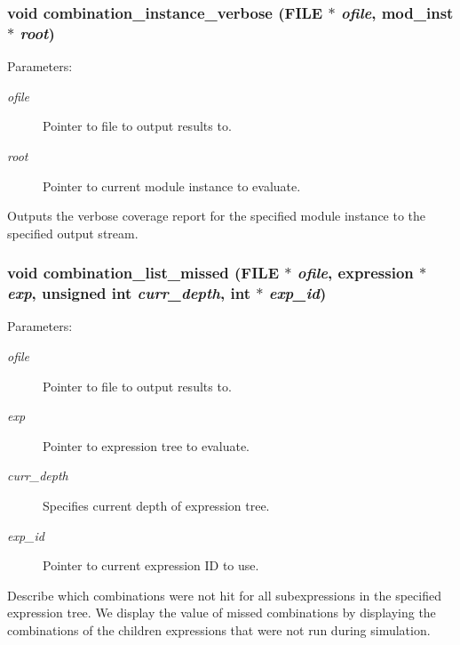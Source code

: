 \subsubsection{\setlength{\rightskip}{0pt plus 5cm}void combination\_\-instance\_\-verbose (FILE $\ast$ {\em ofile}, {\bf mod\_\-inst} $\ast$ {\em root})}\label{comb_8c_a18}


\begin{Desc}
\item[Parameters:]
\begin{description}
\item[{\em ofile}]Pointer to file to output results to. \item[{\em root}]Pointer to current module instance to evaluate.\end{description}
\end{Desc}
Outputs the verbose coverage report for the specified module instance to the specified output stream. 
\subsubsection{\setlength{\rightskip}{0pt plus 5cm}void combination\_\-list\_\-missed (FILE $\ast$ {\em ofile}, {\bf expression} $\ast$ {\em exp}, unsigned int {\em curr\_\-depth}, int $\ast$ {\em exp\_\-id})}\label{comb_8c_a15}


\begin{Desc}
\item[Parameters:]
\begin{description}
\item[{\em ofile}]Pointer to file to output results to. \item[{\em exp}]Pointer to expression tree to evaluate. \item[{\em curr\_\-depth}]Specifies current depth of expression tree. \item[{\em exp\_\-id}]Pointer to current expression ID to use.\end{description}
\end{Desc}
Describe which combinations were not hit for all subexpressions in the specified expression tree. We display the value of missed combinations by displaying the combinations of the children expressions that were not run during simulation. 
